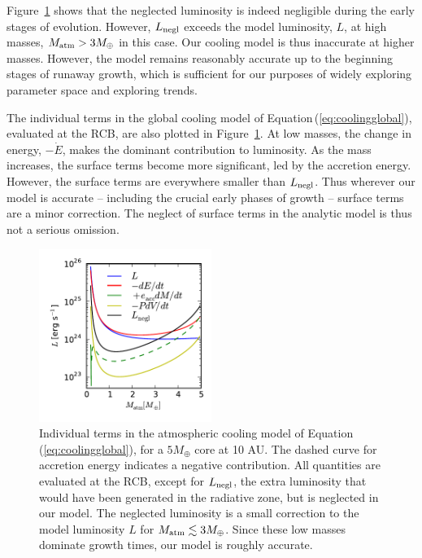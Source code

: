 \documentclass[apj, numberedappendix]{emulateapj}
\newcommand{\Eq}[1]{Equation\,(\ref{#1})}
\newcommand{\Fig}[1]{Figure~\ref{#1}}
\begin{document}
 \Fig{fig:coolingterms} shows that the neglected luminosity is indeed negligible during the early stages of evolution.  However, $L_{\rm negl}$ exceeds the model luminosity, $L$, at high masses, $M_{\rm atm} > 3 M_\oplus$ in this case.  Our cooling model is thus inaccurate at higher masses.  However, the model remains reasonably accurate up to the beginning stages of runaway growth, which is sufficient for our purposes of widely exploring parameter space and exploring trends.
 
The individual terms in the global cooling model of \Eq{eq:coolingglobal}, evaluated at the RCB, are also plotted in \Fig{fig:coolingterms}.  At low masses, the change in energy, $- \dot{E}$, makes the dominant contribution to luminosity.  As the mass increases, the surface terms become more significant, led by the accretion energy.  However, the surface terms are everywhere smaller than $L_{\rm negl}$.  Thus wherever our model is accurate -- including the crucial early phases of growth -- surface terms are a minor correction.  The neglect of surface terms in the analytic model is thus not a serious omission.


 
\begin{figure}[tb]
\centering
\includegraphics[width=0.5\textwidth]{cooling_a10_Mc5_rcb.pdf}
\caption{Individual terms in the atmospheric cooling model of \Eq{eq:coolingglobal}, for a $5 M_\oplus$ core at 10 AU.  The dashed curve for accretion energy indicates a negative contribution.  All quantities are evaluated at the RCB, except for $L_{\rm negl}$, the extra luminosity that would have been generated in the radiative zone, but is neglected in our model. The neglected luminosity is a small correction to the model luminosity $L$ for $M_{\rm atm} \lesssim 3 M_{\oplus}$.   Since these low masses dominate growth times, our model is roughly accurate.}
\label{fig:coolingterms}
\end{figure}
\end{document}
